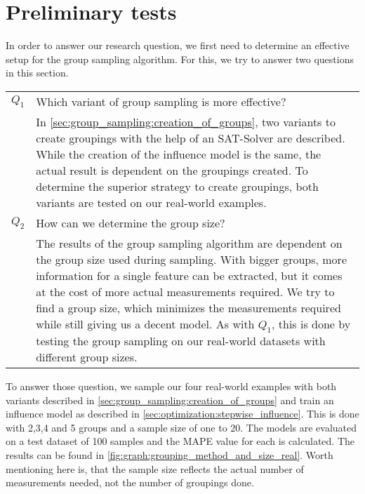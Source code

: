 \documentclass[../../thesis.tex]{subfiles}
\begin{document}
\section{Preliminary tests}
In order to answer our research question, we first need to determine an effective
setup for the group sampling algorithm. For this, we try to answer two questions
in this section.


\begingroup
\renewcommand{\arraystretch}{1.5}
\begin{flushleft}
    \begin{tabular}{lp{}}
        $Q_{1}$ & Which variant of group sampling is more effective?                                        \\
                & In \autoref{sec:group_sampling:creation_of_groups}, two variants to create groupings with
        the help of an SAT-Solver are described. While the creation of the influence model is the same,
        the actual result is dependent on the groupings created. To determine the superior strategy
        to create groupings, both variants are tested on our real-world examples.                           \\
        $Q_{2}$ & How can we determine the group size?                                                      \\
                & The results of the group sampling algorithm are dependent on the group size used during
        sampling. With bigger groups, more information for a single feature can be extracted, but it comes at the
        cost of more actual measurements required. We try to find a group size, which minimizes
        the measurements required while still giving us a decent model. As with $Q_1$, this is done by testing
        the group sampling on our real-world datasets with different group sizes.
    \end{tabular}
\end{flushleft}
\endgroup

To answer those question, we sample our four real-world examples with both variants described
in \autoref{sec:group_sampling:creation_of_groups} and train an influence model as described in
\autoref{sec:optimization:stepwise_influence}.
This is done with 2,3,4 and 5 groups and a sample size of one to 20.
The models are evaluated on a test dataset of 100 samples and the MAPE value for each is calculated.
The results can be found in \autoref{fig:graph:grouping_method_and_size_real}.
Worth mentioning here is, that the sample size reflects the actual number of measurements needed, not the
number of groupings done.
\end{document}
